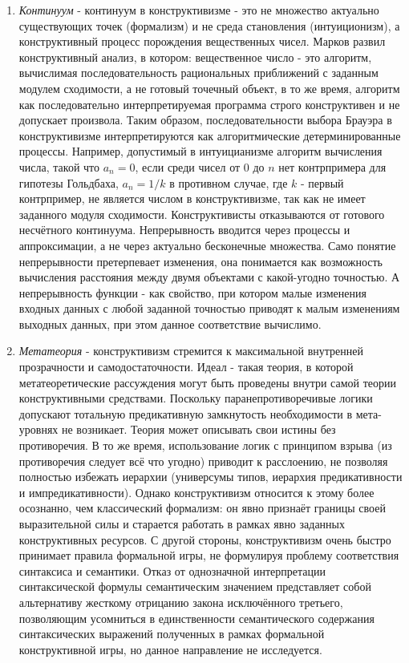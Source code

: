 \documentclass[12pt]{article}
\begin{document}
\begin{enumerate}
    \item {\it Континуум} - континуум в конструктивизме - это не множество актуально существующих точек (формализм) и не среда становления (интуиционизм), а конструктивный процесс порождения вещественных чисел. Марков развил конструктивный анализ, в котором: вещественное число - это алгоритм, вычислимая последовательность рациональных приближений с заданным модулем сходимости, а не готовый точечный объект, в то же время, алгоритм как последовательно интерпретируемая программа строго конструктивен и не допускает произвола. Таким образом, последовательности выбора Брауэра в конструктивизме интерпретируются как алгоритмические детерминированные процессы. Например, допустимый в интуицианизме алгоритм вычисления числа, такой что $a_n = 0$, если среди чисел от $0$ до $n$ нет контрпримера для гипотезы Гольдбаха, $a_n = 1/k$ в противном случае, где $k$ - первый контрпример, не является числом в конструктивизме, так как не имеет заданного модуля сходимости. Конструктивисты отказываются от готового несчётного континуума. Непрерывность вводится через процессы и аппроксимации, а не через актуально бесконечные множества. Само понятие непрерывности претерпевает изменения, она понимается как возможность вычисления расстояния между двумя объектами с какой-угодно точностью. А непрерывность функции - как свойство, при котором малые изменения входных данных с любой заданной точностью приводят к малым изменениям выходных данных, при этом данное соответствие вычислимо.
    \item {\it Метатеория} - конструктивизм стремится к максимальной внутренней прозрачности и самодостаточности. Идеал - такая теория, в которой метатеоретические рассуждения могут быть проведены внутри самой теории конструктивными средствами. Поскольку паранепротиворечивые логики допускают тотальную предикативную замкнутость необходимости в мета-уровнях не возникает. Теория может описывать свои истины без противоречия. В то же время, использование логик с принципом взрыва (из противоречия следует всё что угодно) приводит к расслоению, не позволяя полностью избежать иерархии (универсумы типов, иерархия предикативности и импредикативности). Однако конструктивизм относится к этому более осознанно, чем классический формализм: он явно признаёт границы своей выразительной силы и старается работать в рамках явно заданных конструктивных ресурсов. С другой стороны, конструктивизм очень быстро принимает правила формальной игры, не формулируя проблему соответствия синтаксиса и семантики. Отказ от однозначной интерпретации синтаксической формулы семантическим значением представляет собой альтернативу жесткому отрицанию закона исключённого третьего, позволяющим усомниться в единственности семантического содержания синтаксических выражений полученных в рамках формальной конструктивной игры, но данное направление не исследуется.
\end{enumerate}
\end{document}
